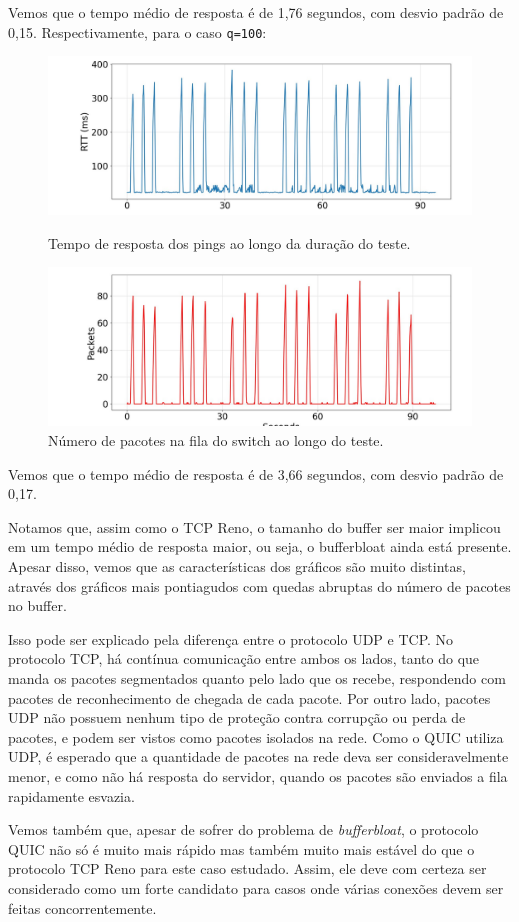 \documentclass[a4paper,12pt]{article}
\newcommand{\code}[1]{\texttt{#1}}
\begin{document}
Vemos que o tempo médio de resposta é de 1,76 segundos, com desvio padrão de 0,15. Respectivamente, para o caso \code{q=100}:

\begin{figure}[ht!]
  \centering
  \includegraphics[width=0.5\columnwidth]{./bufferbloat/bb-q100/quic-rtt.jpg}
  \caption{Tempo de resposta dos pings ao longo da duração do teste.}
  \includegraphics[width=0.5\columnwidth]{./bufferbloat/bb-q100/quic-buffer.jpg}
  \caption{Número de pacotes na fila do switch ao longo do teste.}
\end{figure}

Vemos que o tempo médio de resposta é de 3,66 segundos, com desvio padrão de 0,17.

Notamos que, assim como o TCP Reno, o tamanho do buffer ser maior implicou em um tempo médio de resposta maior, ou seja, o bufferbloat ainda está presente. Apesar disso, vemos que as características dos gráficos são muito distintas, através dos gráficos mais pontiagudos com quedas abruptas do número de pacotes no buffer.

Isso pode ser explicado pela diferença entre o protocolo UDP e TCP. No protocolo TCP, há contínua comunicação entre ambos os lados, tanto do que manda os pacotes segmentados quanto pelo lado que os recebe, respondendo com pacotes de reconhecimento de chegada de cada pacote. Por outro lado, pacotes UDP não possuem nenhum tipo de proteção contra corrupção ou perda de pacotes, e podem ser vistos como pacotes isolados na rede. Como o QUIC utiliza UDP, é esperado que a quantidade de pacotes na rede deva ser consideravelmente menor, e como não há resposta do servidor, quando os pacotes são enviados a fila rapidamente esvazia.

Vemos também que, apesar de sofrer do problema de \textit{bufferbloat}, o protocolo QUIC não só é muito mais rápido mas também muito mais estável do que o protocolo TCP Reno para este caso estudado. Assim, ele deve com certeza ser considerado como um forte candidato para casos onde várias conexões devem ser feitas concorrentemente.
\end{document}
